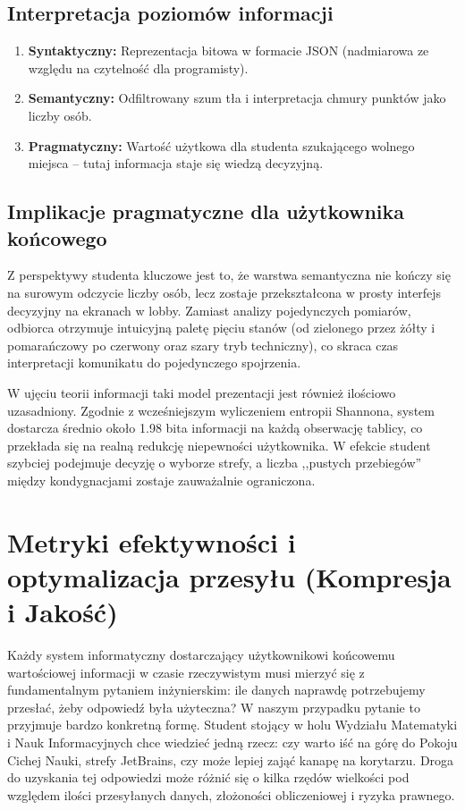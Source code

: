 \documentclass[14pt,a4paper]{extarticle}
\begin{document}
\subsection{Interpretacja poziomów informacji}
\begin{enumerate}
    \item \textbf{Syntaktyczny:} Reprezentacja bitowa w formacie JSON (nadmiarowa ze względu na czytelność dla programisty).
    \item \textbf{Semantyczny:} Odfiltrowany szum tła i interpretacja chmury punktów jako liczby osób.
    \item \textbf{Pragmatyczny:} Wartość użytkowa dla studenta szukającego wolnego miejsca -- tutaj informacja staje się wiedzą decyzyjną.
\end{enumerate}

\subsection{Implikacje pragmatyczne dla użytkownika końcowego}

Z perspektywy studenta kluczowe jest to, że warstwa semantyczna nie kończy się na surowym odczycie liczby osób, lecz zostaje przekształcona w prosty interfejs decyzyjny na ekranach w lobby. Zamiast analizy pojedynczych pomiarów, odbiorca otrzymuje intuicyjną paletę pięciu stanów (od zielonego przez żółty i pomarańczowy po czerwony oraz szary tryb techniczny), co skraca czas interpretacji komunikatu do pojedynczego spojrzenia.

W ujęciu teorii informacji taki model prezentacji jest również ilościowo uzasadniony. Zgodnie z wcześniejszym wyliczeniem entropii Shannona, system dostarcza średnio około 1.98 bita informacji na każdą obserwację tablicy, co przekłada się na realną redukcję niepewności użytkownika. W efekcie student szybciej podejmuje decyzję o wyborze strefy, a liczba ,,pustych przebiegów'' między kondygnacjami zostaje zauważalnie ograniczona.
\section{Metryki efektywności i optymalizacja przesyłu (Kompresja i Jakość)}

Każdy system informatyczny dostarczający użytkownikowi końcowemu wartościowej informacji w czasie rzeczywistym musi mierzyć się z fundamentalnym pytaniem inżynierskim: ile danych naprawdę potrzebujemy przesłać, żeby odpowiedź była użyteczna? W naszym przypadku pytanie to przyjmuje bardzo konkretną formę. Student stojący w holu Wydziału Matematyki i Nauk Informacyjnych chce wiedzieć jedną rzecz: czy warto iść na górę do Pokoju Cichej Nauki, strefy JetBrains, czy może lepiej zająć kanapę na korytarzu. Droga do uzyskania tej odpowiedzi może różnić się o kilka rzędów wielkości pod względem ilości przesyłanych danych, złożoności obliczeniowej i ryzyka prawnego.
\end{document}

